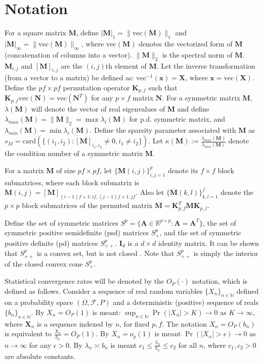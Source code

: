\documentclass[journal,11pt,draftcls,onecolumn]{IEEEtran}
\def\bI{ {\mathbf{I}} }
\def\bK{ {\mathbf{K}} }
\def\bM{ {\mathbf{M}} }
\def\bN{ {\mathbf{N}} }
\def\bX{ {\mathbf{X}} }
\def\nn{{ \parallel   }}
\def\RR{{ \mathbb{R}  }}
\def\NN{{ \mathbb{N}  }}
\def\vec{{ \text{vec} }}
\def\card{{ \text{card} }}
\begin{document}
\section{Notation} \label{sec: notation}
For a square matrix $\mathbf{M}$, define $|\mathbf{M}|_1=\nn \vec(\mathbf{M}) \nn_1$ and $|\mathbf{M}|_\infty=\nn \vec(\mathbf{M}) \nn_\infty$, where $\vec(\mathbf{M})$ denotes the vectorized form of $\mathbf{M}$ (concatenation of columns into a vector). $\nn \mathbf{M} \nn_2$ is the spectral norm of $\bM$. $\mathbf{M}_{i,j}$ and $[\mathbf{M}]_{i,j}$ are the $(i,j)$th element of $\mathbf{M}$. Let the inverse transformation (from a vector to a matrix) be defined as: $\vec^{-1}(\mathbf{x})=\mathbf{X}$, where $\mathbf{x}=\vec(\mathbf{X})$. Define the $pf\times pf$ permutation operator $\bK_{p,f}$ such that $\bK_{p,f} \vec(\bN) = \vec(\bN^T)$ for any $p\times f$ matrix $\bN$. For a symmetric matrix $\mathbf{M}$, $\lambda(\mathbf{M})$ will denote the vector of real eigenvalues of $\mathbf{M}$ and define $\lambda_{max}(\mathbf{M})=\nn\bM \nn_2=\max{\lambda_i(\mathbf{M})}$ for p.d. symmetric matrix, and $\lambda_{min}(\mathbf{M}) = \min{\lambda_i(\mathbf{M})}$. Define the sparsity parameter associated with $\bM$ as $s_{M}=\card(\{(i_1,i_2): [\bM]_{i_1,i_2}\neq 0, i_1\neq i_2 \})$. Let $\kappa(\bM):=\frac{\lambda_{max}(\bM)}{\lambda_{min}(\bM)}$ denote the condition number of a symmetric matrix $\bM$.

For a matrix $\bM$ of size $pf\times pf$, let $\{\bM(i,j)\}_{i,j=1}^p$ denote its $f\times f$ block submatrices, where each block submatrix is $\bM(i,j)=[\bM]_{(i-1)f+1:if,(j-1)f+1:jf}$. Also let $\{\overline{\bM}(k,l)\}_{k,l=1}^f$ denote the $p\times p$ block submatrices of the permuted matrix $\overline{\bM}=\bK_{p,f}^T \bM \bK_{p,f}$.

Define the set of symmetric matrices $S^p = \{\mathbf{A}\in \RR^{p\times p}: \mathbf{A}=\mathbf{A}^T\}$, the set of symmetric positive semidefinite (psd) matrices $S_{+}^p$, and the set of symmetric positive definite (pd) matrices $S_{++}^p$. $\bI_d$ is a $d\times d$ identity matrix. It can be shown that $S_{++}^p$ is a convex set, but is not closed \cite{ConvexOpt}. Note that $S_{++}^p$ is simply the interior of the closed convex cone $S_{+}^p$.

Statistical convergence rates will be denoted by the $O_P(\cdot)$ notation, which is defined as follows. Consider a sequence of real random variables $\{X_n\}_{n \in \NN}$ defined on a probability space $(\Omega,\mathcal{F},P)$ and a deterministic (positive) sequence of reals $\{b_n\}_{n\in \NN}$. By $X_n=O_P(1)$ is meant: $\sup_{n\in \NN}{\Pr(|X_n|>K)} \to 0$ as $K\to\infty$, where $\bX_n$ is a sequence indexed by $n$, for fixed $p,f$. %
The notation $X_n=O_P(b_n)$ is equivalent to $\frac{X_n}{b_n}=O_P(1)$. By $X_n=o_p(1)$ is meant $\Pr(|X_n|>\epsilon) \to 0$ as $n\to\infty$ for any $\epsilon>0$. By $\lambda_n \asymp b_n$ is meant $c_1 \leq \frac{\lambda_n}{b_n} \leq c_2$ for all $n$, where $c_1,c_2>0$ are absolute constants.
\end{document}
